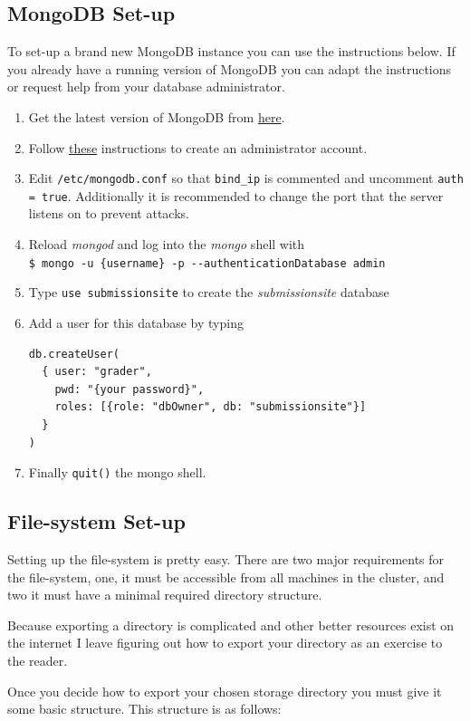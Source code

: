 \documentclass[11pt]{report}
\begin{document}
\subsection{MongoDB Set-up}
To set-up a brand new MongoDB instance you can use the instructions below. If you already have a running version
of MongoDB you can adapt the instructions or request help from your database administrator.
\begin{enumerate}
\item Get the latest version of MongoDB from \href{http://docs.mongodb.org/manual/tutorial/install-mongodb-on-ubuntu/}{here}.
\item Follow \href{http://docs.mongodb.org/manual/tutorial/enable-authentication/}{these} instructions to create an administrator account.
\item Edit \verb|/etc/mongodb.conf| so that 
\verb|bind_ip| is commented and uncomment
\verb|auth = true|. Additionally it is recommended to change the port that the server listens on
to prevent attacks.
\item Reload \emph{mongod} and log into the \emph{mongo} shell with\\
\verb|$ mongo -u {username} -p --authenticationDatabase admin|
\item Type \verb|use submissionsite| to create the \emph{submissionsite} database
\item Add a user for this database by typing
\begin{verbatim}
db.createUser(
  { user: "grader", 
    pwd: "{your password}",
    roles: [{role: "dbOwner", db: "submissionsite"}] 
  }
)
\end{verbatim}
\item Finally \verb|quit()| the mongo shell.
\end{enumerate}

\subsection{File-system Set-up}
Setting up the file-system is pretty easy. There are two major requirements for the file-system, one, it
must be accessible from all machines in the cluster, and two it must have a minimal required directory
structure.

Because exporting a directory is complicated and other better resources exist on the internet I leave
figuring out how to export your directory as an exercise to the reader.

Once you decide how to export your chosen storage directory you must give it some basic structure. This
structure is as follows:
\end{document}
